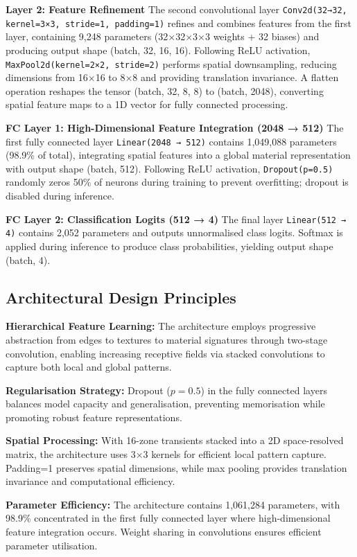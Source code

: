 \documentclass[12pt,a4paper,oneside]{report}
\begin{document}
\textbf{Layer 2: Feature Refinement}
The second convolutional layer \texttt{Conv2d(32→32, kernel=3×3, stride=1, padding=1)} refines and combines features from the first layer, containing 9,248 parameters (32×32×3×3 weights + 32 biases) and producing output shape (batch, 32, 16, 16). Following ReLU activation, \texttt{MaxPool2d(kernel=2×2, stride=2)} performs spatial downsampling, reducing dimensions from 16×16 to 8×8 and providing translation invariance. A flatten operation reshapes the tensor (batch, 32, 8, 8) to (batch, 2048), converting spatial feature maps to a 1D vector for fully connected processing.

\textbf{FC Layer 1: High-Dimensional Feature Integration (2048 → 512)}
The first fully connected layer \texttt{Linear(2048 → 512)} contains 1,049,088 parameters (98.9\% of total), integrating spatial features into a global material representation with output shape (batch, 512). Following ReLU activation, \texttt{Dropout(p=0.5)} randomly zeros 50\% of neurons during training to prevent overfitting; dropout is disabled during inference.

\textbf{FC Layer 2: Classification Logits (512 → 4)}
The final layer \texttt{Linear(512 → 4)} contains 2,052 parameters and outputs unnormalised class logits. Softmax is applied during inference to produce class probabilities, yielding output shape (batch, 4).

\subsection{Architectural Design Principles}

\textbf{Hierarchical Feature Learning:} The architecture employs progressive abstraction from edges to textures to material signatures through two-stage convolution, enabling increasing receptive fields via stacked convolutions to capture both local and global patterns.

\textbf{Regularisation Strategy:} Dropout ($p=0.5$) in the fully connected layers balances model capacity and generalisation, preventing memorisation while promoting robust feature representations.

\textbf{Spatial Processing:} With 16-zone transients stacked into a 2D space-resolved matrix, the architecture uses 3×3 kernels for efficient local pattern capture. Padding=1 preserves spatial dimensions, while max pooling provides translation invariance and computational efficiency.

\textbf{Parameter Efficiency:} The architecture contains 1,061,284 parameters, with 98.9\% concentrated in the first fully connected layer where high-dimensional feature integration occurs. Weight sharing in convolutions ensures efficient parameter utilisation.
\end{document}
